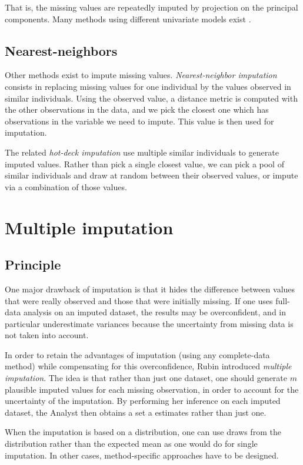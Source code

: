 That is, the missing values are repeatedly imputed by projection on the principal components. Many methods using different univariate models exist \cite{MICE_founding}\cite{stekhoven2015missforest}\cite{van2007multiple}.
		
		\subsection{Nearest-neighbors}
Other methods exist to impute missing values. \emph{Nearest-neighbor imputation}\cite{chen2000nearest}  consists in replacing missing values for one individual by the values observed in similar individuals. Using the observed value, a distance metric is computed with the other observations in the data, and we pick the closest one which has observations in the variable we need to impute. This value is then used for imputation.

 The related \emph{hot-deck imputation} \cite{andridge2010hotdeck} use multiple similar individuals to generate imputed values. Rather than pick a single closest value, we can pick a pool of similar individuals and draw at random between their observed values, or impute via a combination of those values.

	\section{Multiple imputation}
		\subsection{Principle}
One major drawback of imputation is that it hides the difference between values that were really observed and those that were initially missing. If one uses full-data analysis on an imputed dataset, the results may be overconfident, and in particular underestimate variances because the uncertainty from missing data is not taken into account.

In order to retain the advantages of imputation (using any complete-data method) while compensating for this overconfidence, Rubin \cite{rubin1986mi_founding} introduced \emph{multiple imputation}. The idea is that rather than just one dataset, one should generate $m$ plausible imputed values for each missing observation, in order to account for the uncertainty of the imputation. By performing her inference on each imputed dataset, the Analyst then obtains a set a estimates rather than just one. 

When the imputation is based on a distribution, one can use draws from the distribution rather than the expected mean as one would do for single imputation. In other cases, method-specific approaches have to be designed.

